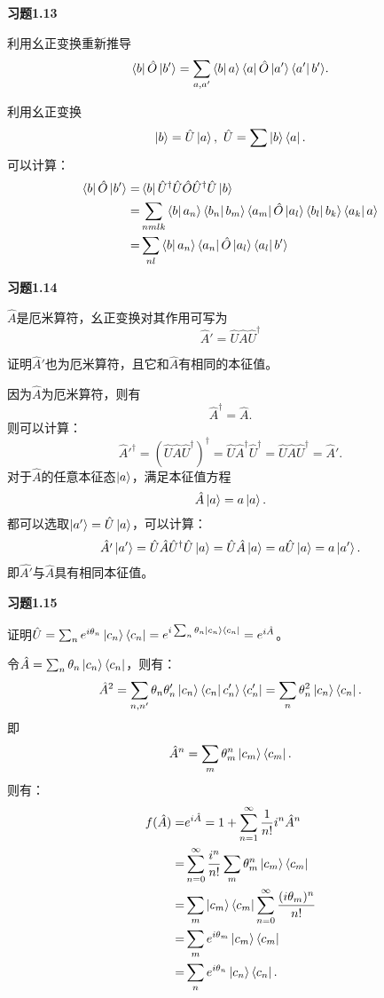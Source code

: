 \documentclass[reqno,a4paper,12pt]{amsart}
\begin{document}
\textbf{习题1.13}

利用幺正变换重新推导
\[
	\bra{b} \hat{O} \ket{b'} = \sum_{a,a'} \bra{b} a \rangle \bra{a} \hat{O} \ket{a'} \bra{a'} b' \rangle.
\]
\begin{tcolorbox}[breakable, colback = black!5!white, colframe = black]
利用幺正变换
\[
	\ket{b} = \hat{U} \ket{a}, ~ \hat{U} = \sum \ket{b}\bra{a}.
\]
可以计算：
\begin{align*}
	\bra{b} \hat{O} \ket{b'} =& \bra{b} \hat{U}^\dagger \hat{U} \hat{O} \hat{U}^\dagger\hat{U} \ket{b} \\
	=& \sum_{nmlk} \bra{b} a_n \rangle \bra{b_n} b_m \rangle \bra{a_m} \hat{O} \ket{a_l} \bra{b_l} b_k \rangle \bra{a_k} a \rangle \\
	=& \sum_{nl} \bra{b} a_n \rangle \bra{a_n} \hat{O} \ket{a_l} \bra{a_l} b' \rangle
\end{align*}
\end{tcolorbox}

\textbf{习题1.14}

$\hat{A}$是厄米算符，幺正变换对其作用可写为
\[
	\hat{A}' = \hat{U} \hat{A} \hat{U}^\dagger
\]

证明$\hat{A}'$也为厄米算符，且它和$\hat{A}$有相同的本征值。
\begin{tcolorbox}[breakable, colback = black!5!white, colframe = black]
因为$\hat{A}$为厄米算符，则有
\[
	\hat{A}^\dagger = \hat{A}.
\]
则可以计算：
\[
	\hat{A}'^\dagger = (\hat{U}\hat{A}\hat{U}^\dagger)^\dagger = \hat{U} \hat{A}^\dagger \hat{U}^\dagger = \hat{U} \hat{A} \hat{U}^\dagger = \hat{A}'.
\]
对于$\hat{A}$的任意本征态$\ket{a}$，满足本征值方程
\[
	\hat{A} \ket{a} = a \ket{a}.
\]
都可以选取$\ket{a'} = \hat{U} \ket{a}$，可以计算：
\[
	\hat{A'} \ket{a'} = \hat{U}\hat{A}\hat{U}^\dagger \hat{U} \ket{a} = \hat{U} \hat{A} \ket{a} = a\hat{U}\ket{a} = a\ket{a'}.
\]
即$\hat{A'}$与$\hat{A}$具有相同本征值。
\end{tcolorbox}

\textbf{习题1.15}

证明$\hat{U} = \sum_n e^{i\theta_n}\ket{c_n}\bra{c_n} = e^{i\sum_n \theta_n\ket{c_n} \bra{c_n}} = e^{i\hat{A}}$。
\begin{tcolorbox}[breakable, colback = black!5!white, colframe = black]
令$\hat{A} = \sum_n \theta_n \ket{c_n} \bra{c_n}$，则有：
\[
	\hat{A}^2 = \sum_{n,n'} \theta_n \theta_n' \ket{c_n}\bra{c_n} c_n' \rangle \bra{c_n'} = \sum_n \theta_n^2 \ket{c_n}\bra{c_n}.
\]
即
\[
	\hat{A}^n = \sum_{m} \theta_m^n \ket{c_m} \bra{c_m}.
\]
则有：
\begin{align*}
	f(\hat{A}) =& e^{i\hat{A}} = 1 + \sum_{n=1}^\infty \frac{1}{n!} i^n \hat{A}^n \\
	=& \sum_{n=0}^\infty \frac{i^n}{n!} \sum_{m} \theta_m^n \ket{c_m} \bra{c_m} \\
	=& \sum_m \ket{c_m}\bra{c_m} \sum_{n=0}^\infty \frac{(i\theta_m)^n}{n!} \\
	=& \sum_m e^{i\theta_m} \ket{c_m} \bra{c_m} \\
	=& \sum_n e^{i\theta_n} \ket{c_n} \bra{c_n}.
\end{align*}
\end{tcolorbox}
\end{document}
